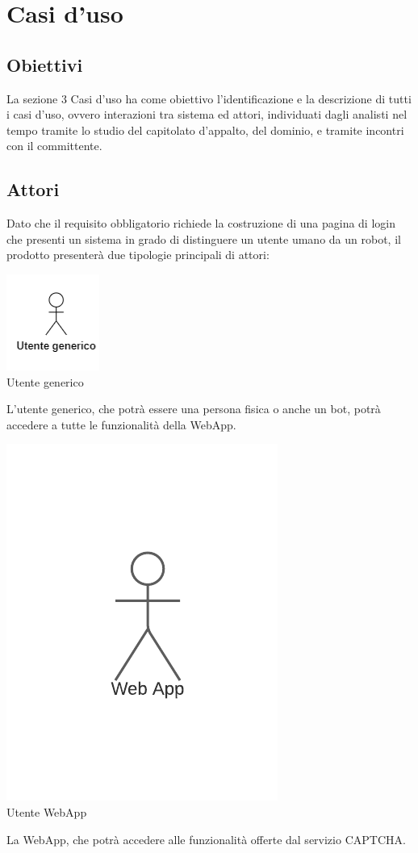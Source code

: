 \section{Casi d'uso}

\subsection{Obiettivi}
La sezione 3 Casi d'uso ha come obiettivo l'identificazione e la descrizione di tutti i casi d'uso, ovvero interazioni tra sistema ed attori, individuati dagli analisti nel tempo tramite lo studio del capitolato d'appalto, del dominio, e tramite incontri con il committente.

\subsection{Attori}
Dato che il requisito obbligatorio richiede la costruzione di una pagina di login che presenti un sistema in grado di distinguere un utente umano da un robot, il prodotto presenterà due tipologie principali di attori:
\begin{center}
\includegraphics[scale = 1]{img/utente_generico.png}\\
\caption{Utente generico}
\end{center}
L'utente generico, che potrà essere una persona fisica o anche un bot, potrà accedere a tutte le funzionalità della WebApp. \\
\begin{center}
\includegraphics[scale = 1]{img/webapp.png}\\
\caption{Utente WebApp}
\end{center}
La WebApp, che potrà accedere alle funzionalità offerte dal servizio CAPTCHA. \\

